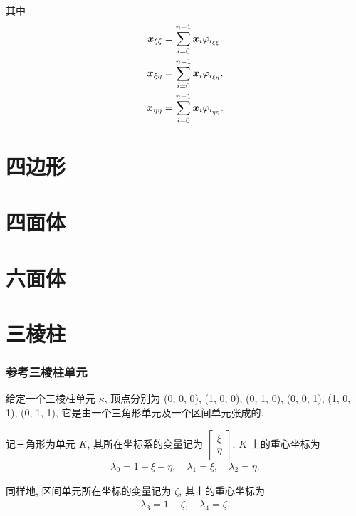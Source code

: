 \documentclass{beamer}
\numberwithin{subsection}{section}
\begin{document}
\begin{frame}	
其中
	\begin{align*}
	{\boldsymbol x}_{\xi\xi} &= \sum_{i=0}^{n-1}{\boldsymbol x}_i\varphi_{i_{\xi\xi}}.\\
	{\boldsymbol x}_{\xi\eta} &= \sum_{i=0}^{n-1}{\boldsymbol x}_i\varphi_{i_{\xi\eta}}.\\
	{\boldsymbol x}_{\eta\eta} &= \sum_{i=0}^{n-1}{\boldsymbol x}_i\varphi_{i_{\eta\eta}}.
	\end{align*}


\end{frame}


\section{四边形}
\section{四面体}
\section{六面体}
\section{三棱柱}
\begin{frame}
    \frametitle{参考三棱柱单元}
    给定一个三棱柱单元 $\kappa$, 顶点分别为 (0, 0, 0), (1, 0, 0), (0, 1, 0),
    (0, 0, 1), (1, 0, 1), (0, 1, 1), 它是由一个三角形单元及一个区间单元张成的.
    
    记三角形为单元 $K$, 其所在坐标系的变量记为 $\begin{bmatrix} \xi \\ \eta
    \end{bmatrix}$, $K$ 上的重心坐标为
    \begin{align*}
        \lambda_0 = 1 - \xi - \eta,\quad \lambda_1 = \xi, 
        \quad \lambda_2 = \eta.
    \end{align*}
    
    同样地, 区间单元所在坐标的变量记为 $\zeta$, 其上的重心坐标为
    \begin{align*}
        \lambda_3 = 1-\zeta,\quad
        \lambda_4 =\zeta.
    \end{align*}
\end{frame}
\end{document}
